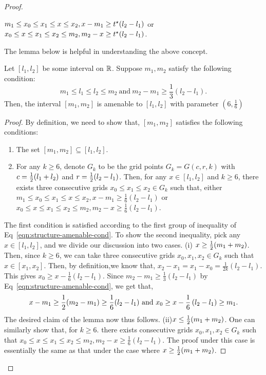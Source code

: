 \begin{proof}
\begin{definition}
\begin{enumerate}
	$m_1 \leq x_0 \leq x_1 \leq x \leq x_2, x- m_1 \geq t^\star (l_2 - l_1)$ 
	or $x_0 \leq x \leq x_1 \leq x_2 \leq m_2, m_2 - x \geq t^\star (l_2 - l_1)$. 
\end{enumerate}
\end{definition}\noindent
The lemma below is helpful in understanding the above concept. 
\begin{lemma}
\label{lemma:structure-amenable}
Let $ [l_1, l_2]$ be some interval on $\mathbb{R}$. Suppose $m_1, m_2$ satisfy
the following condition: 
\begin{equation}
\label{eqn:structure-amenable-cond}
m_1 \leq l_1 \leq l_2 \leq  m_2~\text{and}~m_2 - m_1 \geq \frac{1}{3}(l_2 - l_1).
\end{equation}
Then, the interval $[m_1, m_2]$ is amenable to $[l_1, l_2]$ with parameter 
$\left(6, \frac{1}{6} \right)$
\end{lemma}
\begin{proof}
By definition, we need to show that, $[m_1, m_2]$ satisfies the following conditions:
\begin{enumerate}
\item The set $[m_1, m_2] \subseteq [l_1, l_2]$.
\item For any $k \geq 6$, denote $G_k$ to be the grid points 
	$G_k = G(c, r, k)$ with $c = \frac{1}{2}(l_1 + l_2)$ and $r = \frac{1}{2}(l_2 - l_1)$. 
	Then, for any $x \in [l_1, l_2]$ and $k \geq 6$, there exists three 
	consecutive grids $x_0 \leq x_1 \leq x_2 \in G_k$ such that, either 
	$m_1 \leq x_0 \leq x_1 \leq x \leq x_2, x- m_1 \geq \frac{1}{6}(l_2 - l_1)$ 
	or $x_0 \leq x \leq x_1 \leq x_2 \leq m_2, m_2 - x \geq \frac{1}{6}(l_2 - l_1)$. 
\end{enumerate}
The first condition is satisfied according to the first group of inequality of 
Eq~\eqref{eqn:structure-amenable-cond}. To show the second inequality, 
pick any $x \in [l_1, l_2]$, and we divide our discussion into two cases.
(i) $x \geq \frac{1}{2} (m_1 + m_2)$. Then, since $k \geq 6$, we can take three 
consecutive grids $x_0, x_1, x_2 \in G_k$ such that $x \in [x_1, x_2]$. Then, 
by definition,we know that, $x_2 - x_1 = x_1 - x_0 = \frac{1}{2k}(l_2 - l_1)$. 
This gives $x_0 \geq  x - \frac{1}{6} \left(l_2 - l_1\right)$. 
Since $m_2 - m_1 \geq \frac{1}{3} (l_2 - l_1)$ by Eq~\eqref{eqn:structure-amenable-cond}, 
we get that, 
\begin{equation*}
x - m_1 \geq \frac{1}{2} (m_2 - m_1) \geq \frac{1}{6} (l_2 - l_1)~\text{and}~
	x_0 \geq x - \frac{1}{6} \left(l_2 - l_1\right) \geq m_1. 
\end{equation*}
The desired claim of the lemma now thus follows. (ii)$x \leq \frac{1}{2} (m_1 + m_2)$.
One can similarly show that, for $k \geq 6$. there exists consecutive grids 
$x_0, x_1, x_2 \in G_k$ such that $x_0 \leq x \leq x_1 \leq x_2 \leq m_2, m_2 - x \geq \frac{1}{6}(l_2 - l_1)$. 
The proof under this case is essentially the same as that under the case 
where $x \geq \frac{1}{2} (m_1 + m_2)$. 
\end{proof}


\end{proof}
